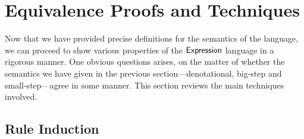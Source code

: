 

\section{Equivalence Proofs and Techniques}%

Now that we have provided precise definitions for the semantics of the
language, we can proceed to show various properties of the $\textsf{Expression}$
language in a rigorous manner. One obvious questions arises, on the matter
of whether the semantics we have given in the previous
section---denotational, big-step and small-step---agree in some manner.
This section reviews the main techniques involved.

\subsection{Rule Induction}%

